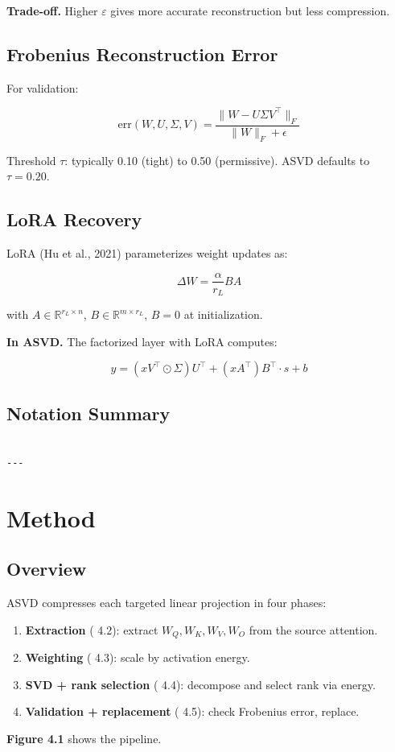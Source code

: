 \textbf{Trade-off.} Higher $\varepsilon$ gives more accurate reconstruction but 
less compression.

\subsection{Frobenius Reconstruction Error}

For validation:

\[
\text{err}(W, U, \Sigma, V) = \frac{\|W - U \Sigma V^\top\|_F}{\|W\|_F + \epsilon}
\]

Threshold $\tau$: typically 0.10 (tight) to 0.50 (permissive). ASVD 
defaults to $\tau = 0.20$.

\subsection{LoRA Recovery}

LoRA (Hu et al., 2021) parameterizes weight updates as:

\[
\Delta W = \frac{\alpha}{r_L} B A
\]

with $A \in \mathbb{R}^{r_L \times n}$, $B \in \mathbb{R}^{m \times r_L}$, 
$B = 0$ at initialization.

\textbf{In ASVD.} The factorized layer with LoRA computes:

\[
y = (x V^\top \odot \Sigma) U^\top + (x A^\top) B^\top \cdot s + b
\]

\subsection{Notation Summary}

\begin{lstlisting}

---
\end{lstlisting}


\section{Method}

\subsection{Overview}

ASVD compresses each targeted linear projection in four phases:

\begin{enumerate}
\item \textbf{Extraction} ( 4.2): extract $W_Q, W_K, W_V, W_O$ from the source
  attention.
\item \textbf{Weighting} ( 4.3): scale by activation energy.
\item \textbf{SVD + rank selection} ( 4.4): decompose and select rank via energy.
\item \textbf{Validation + replacement} ( 4.5): check Frobenius error, replace.

\end{enumerate}
\textbf{Figure 4.1} shows the pipeline.

